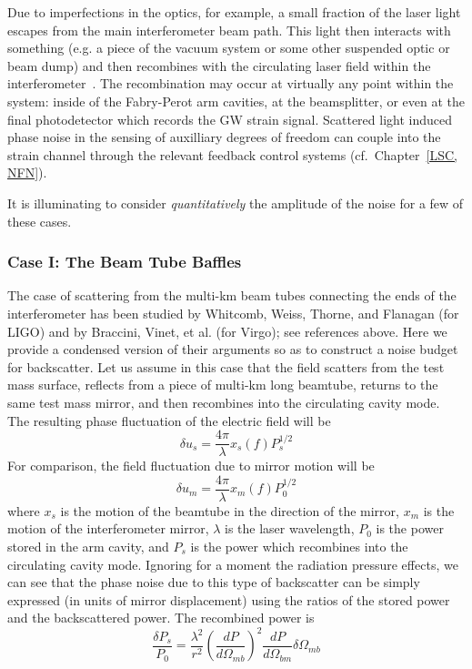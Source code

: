 Due to imperfections in the optics, for example, a small fraction of
the laser light escapes from the main interferometer beam path. This
light then interacts with something (e.g. a piece of the vacuum system
or some other suspended optic or beam dump) and then recombines with the
circulating laser field within the interferometer~\cite{Kip:Scatter95, Kip:scatter1989, Sam:Scatter2012,
Stefano:Scatter, vinet1997scattered, fritschel1998high}.
The recombination may occur at virtually any point within the system:
inside of the Fabry-Perot arm cavities, at the beamsplitter, or even at
the final photodetector which records the GW strain signal. Scattered
light induced phase noise in the sensing of auxilliary degrees of
freedom can couple into the strain channel through the relevant
feedback control systems (cf.~Chapter~\ref{LSC, NFN}).

It is illuminating to consider \emph{quantitatively} the amplitude of
the noise for a few of these cases.

\subsubsection{Case I: The Beam Tube Baffles}
The case of scattering from the multi-km beam tubes connecting the ends of the
interferometer has been studied by Whitcomb, Weiss, Thorne, and Flanagan (for LIGO)
and by Braccini, Vinet, et al. (for Virgo); see references above. Here we provide
a condensed version of their arguments so as to construct a noise budget for backscatter.
Let us assume in this case that the field scatters from the test mass surface,
reflects from a piece of multi-km long beamtube, returns to the same test mass
mirror, and then recombines into the circulating cavity mode. The resulting phase
fluctuation of the electric field will be
\begin{equation}
\delta u_{s} = \frac{4 \pi}{\lambda} x_{s}(f) P_s^{1/2}
\end{equation}
For comparison, the field fluctuation due to mirror motion will be
\begin{equation}
\delta u_{m} = \frac{4 \pi}{\lambda} x_{m}(f) P_0^{1/2}
\end{equation}
where $x_s$ is the motion of the beamtube in the direction of the mirror, $x_m$
is the motion of the interferometer mirror, $\lambda$ is the laser wavelength,
$P_0$ is the power stored in the arm cavity, and $P_s$ is the power which
recombines into the circulating cavity mode. Ignoring for a moment the radiation
pressure effects, we can see that the phase noise due to this type of backscatter
can be simply expressed (in units of mirror displacement) using the ratios of
the stored power and the backscattered power. The recombined power is
\begin{equation}
\frac{\delta P_s}{P_0} = \frac{\lambda^2}{r^2} \left( \frac{dP}{d\Omega_{mb}}\right)^2 \frac{dP}{d\Omega_{bm}} \delta \Omega_{mb}
\end{equation}



